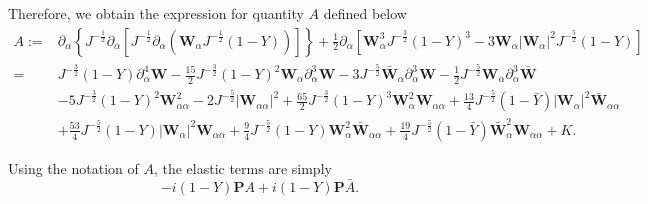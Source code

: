 \documentclass[10pt]{amsart}
\theoremstyle{remark}
\theoremstyle{definition}
\numberwithin{equation}{section}
\newcommand{\p}{\partial}
\newcommand{\al}{\alpha}
\newcommand{\f}{\frac}
\newcommand{\bw}{\mathbf{W}}
\newcommand{\nP}{{\mathbf P}}
\begin{document}
Therefore, we obtain the expression for quantity $A$ defined below
\begin{align*}
A:=&\p_\al\left\{J^{-\f12}\p_\al\left[J^{-\f12}\p_\al\left(\mathbf{W}_{\al}J^{-\f12}(1-Y)\right)\right]\right\}+\f12\p_\al\left[\mathbf{W}^3_{\al}J^{-\f32}(1-Y)^3-3\mathbf{W}_{\al}|\mathbf{W}_{\al}|^2 J^{-\f52}(1-Y)\right]\\
=&J^{-\f32}(1-Y)\p^4_{\al}\bw-\f{15}{2}J^{-\f32}(1-Y)^2\bw_{\al}\p^3_{\al}\bw-3 J^{-\f52}\bar{\bw}_{\al}\p^3_{\al}\bw-\f12 J^{-\f52}
\bw_{\al}\p^3_{\al}\bar{\bw}\\
&-5J^{-\f32}(1-Y)^2\bw^2_{\al\al}-2 J^{-\f52}
|\bw_{\al\al}|^2+\f{65}{2}J^{-\f32}(1-Y)^3\bw_{\al}^2\bw_{\al\al}+\f{13}{4}J^{-\f52}(1-\bar{Y})|\bw_{\al}|^2\bar{\bw}_{\al\al}\\
&+\f{53}{4}J^{-\f52}(1-Y)|\bw_{\al}|^2\bw_{\al\al}+\f{9}{4}J^{-\f52}(1-Y)\bw^2_\al\bar{\bw}_{\al\al}+\f{19}{4}J^{-\f52}(1-\bar{Y})\bar{\bw}_{\al}^2\bw_{\al\al}+K.
\end{align*}

Using the notation of $A$, the elastic terms are simply
\begin{equation*}
    -i(1-Y)\nP A + i(1-Y)\nP\bar{A}.
\end{equation*}
\end{document}
